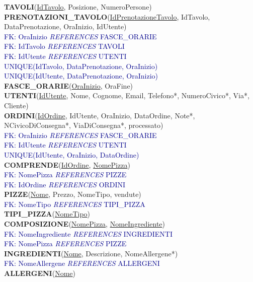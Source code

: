 \documentclass[a4paper,12pt, oneside]{article}
\begin{document}
\textbf{TAVOLI}(\underline{IdTavolo}, Posizione, NumeroPersone) \\
\textbf{PRENOTAZIONI\_TAVOLO}(\underline{IdPrenotazioneTavolo}, IdTavolo, DataPrenotazione, OraInizio, IdUtente) \\
\textcolor{darkBlue}{FK: OraInizio \textit{REFERENCES} FASCE\_ORARIE} \\
\textcolor{darkBlue}{FK: IdTavolo \textit{REFERENCES} TAVOLI} \\
\textcolor{darkBlue}{FK: IdUtente \textit{REFERENCES} UTENTI} \\
\textcolor{darkBlue}{UNIQUE(IdTavolo, DataPrenotazione, OraInizio)} \\
\textcolor{darkBlue}{UNIQUE(IdUtente, DataPrenotazione, OraInizio)} \\
\textbf{FASCE\_ORARIE}(\underline{OraInizio}, OraFine) \\
\textbf{UTENTI}(\underline{IdUtente}, Nome, Cognome, Email, Telefono*, NumeroCivico*, Via*, Cliente) \\
\textbf{ORDINI}(\underline{IdOrdine}, IdUtente, OraInizio, DataOrdine, Note*, NCivicoDiConsegna*, ViaDiConsegna*, processato) \\
\textcolor{darkBlue}{FK: OraInizio \textit{REFERENCES} FASCE\_ORARIE} \\
\textcolor{darkBlue}{FK: IdUtente \textit{REFERENCES} UTENTI} \\
\textcolor{darkBlue}{UNIQUE(IdUtente, OraInizio, DataOrdine)} \\
\textbf{COMPRENDE}(\underline{IdOrdine}, \underline{NomePizza}) \\
\textcolor{darkBlue}{FK: NomePizza \textit{REFERENCES} PIZZE} \\
\textcolor{darkBlue}{FK: IdOrdine \textit{REFERENCES} ORDINI} \\
\textbf{PIZZE}(\underline{Nome}, Prezzo, NomeTipo, vendute) \\
\textcolor{darkBlue}{FK: NomeTipo \textit{REFERENCES} TIPI\_PIZZA} \\
\textbf{TIPI\_PIZZA}(\underline{NomeTipo}) \\
\textbf{COMPOSIZIONE}(\underline{NomePizza}, \underline{NomeIngrediente}) \\
\textcolor{darkBlue}{FK: NomeIngrediente \textit{REFERENCES} INGREDIENTI} \\
\textcolor{darkBlue}{FK: NomePizza \textit{REFERENCES} PIZZE} \\
\textbf{INGREDIENTI}(\underline{Nome}, Descrizione, NomeAllergene*) \\
\textcolor{darkBlue}{FK: NomeAllergene \textit{REFERENCES} ALLERGENI} \\
\textbf{ALLERGENI}(\underline{Nome})
\end{document}
